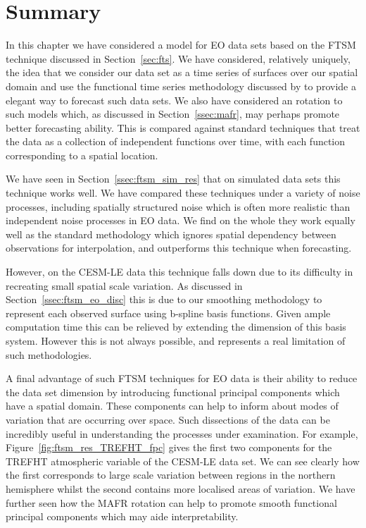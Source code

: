 \section{Summary \label{sec:ftsm_summary}}
In this chapter we have considered a model for EO data sets based on the FTSM technique discussed in Section~\ref{sec:fts}.
We have considered, relatively uniquely, the idea that we consider our data set as a time series of surfaces over our spatial domain and use the functional time series methodology discussed by \citep{hyndman_forecasting_2009} to provide a elegant way to forecast such data sets.
We also have considered an rotation to such models which, as discussed in Section~\ref{ssec:mafr}, may perhaps promote better forecasting ability.
This is compared against standard techniques that treat the data as a collection of independent functions over time, with each function corresponding to a spatial location. 


We have seen in Section~\ref{ssec:ftsm_sim_res} that on simulated data sets this technique works well.
We have compared these techniques under a variety of noise processes, including spatially structured noise which is often more realistic than independent noise processes in EO data.
We find on the whole they work equally well as the standard methodology which ignores spatial dependency between observations for interpolation, and outperforms this technique when forecasting.

However, on the CESM-LE data this technique falls down due to its difficulty in recreating small spatial scale variation.
As discussed in Section~\ref{ssec:ftsm_eo_disc} this is due to our smoothing methodology to represent each observed surface using b-spline basis functions.
Given ample computation time this can be relieved by extending the dimension of this basis system.
However this is not always possible, and represents a real limitation of such methodologies.

A final advantage of such FTSM techniques for EO data is their ability to reduce the data set dimension by introducing functional principal components which have a spatial domain.
These components can help to inform about modes of variation that are occurring over space.
Such dissections of the data can be incredibly useful in understanding the processes under examination. 
For example, Figure~\ref{fig:ftsm_res_TREFHT_fpc} gives the first two components for the TREFHT atmospheric variable of the CESM-LE data set.
We can see clearly how the first corresponds to large scale variation between regions in the northern hemisphere whilst the second contains more localised areas of variation. 
We have further seen how the MAFR rotation can help to promote smooth functional principal components which may aide interpretability. 

